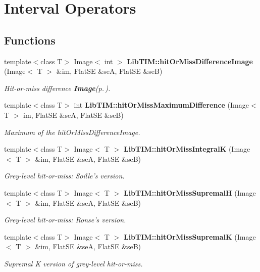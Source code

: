 \section{Interval Operators}
\label{group__interval}
\subsection*{Functions}
\begin{CompactItemize}
\item 
template$<$class T$>$ Image$<$ int $>$ {\bf Lib\-TIM::hit\-Or\-Miss\-Difference\-Image} (Image$<$ T $>$ \&im, Flat\-SE \&se\-A, Flat\-SE \&se\-B)
\begin{CompactList}\small\item\em Hit-or-miss difference {\bf Image}{\rm (p.\,\pageref{classLibTIM_1_1Image})}. \item\end{CompactList}\item 
template$<$class T$>$ int {\bf Lib\-TIM::hit\-Or\-Miss\-Maximum\-Difference} (Image$<$ T $>$ im, Flat\-SE \&se\-A, Flat\-SE \&se\-B)
\begin{CompactList}\small\item\em Maximum of the hit\-Or\-Miss\-Difference\-Image. \item\end{CompactList}\item 
template$<$class T$>$ Image$<$ T $>$ {\bf Lib\-TIM::hit\-Or\-Miss\-Integral\-K} (Image$<$ T $>$ \&im, Flat\-SE \&se\-A, Flat\-SE \&se\-B)
\begin{CompactList}\small\item\em Grey-level hit-or-miss: Soille's version. \item\end{CompactList}\item 
template$<$class T$>$ Image$<$ T $>$ {\bf Lib\-TIM::hit\-Or\-Miss\-Supremal\-H} (Image$<$ T $>$ \&im, Flat\-SE \&se\-A, Flat\-SE \&se\-B)
\begin{CompactList}\small\item\em Grey-level hit-or-miss: Ronse's version. \item\end{CompactList}\item 
template$<$class T$>$ Image$<$ T $>$ {\bf Lib\-TIM::hit\-Or\-Miss\-Supremal\-K} (Image$<$ T $>$ \&im, Flat\-SE \&se\-A, Flat\-SE \&se\-B)
\begin{CompactList}\small\item\em Supremal K version of grey-level hit-or-miss. \item\end{CompactList}\item 

\end{CompactItemize}
